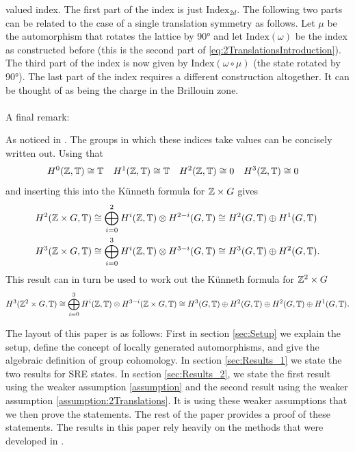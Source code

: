 \documentclass[11pt,a4paper,twoside]{article}
\numberwithin{equation}{section}
\begin{document}
	valued index. The first part of the index is just $\textrm{Index}_{2d}$. The following two parts can be related to the case of a single translation symmetry as follows. Let $\mu$ be the automorphism that rotates the lattice by 90° and let $\textrm{Index}(\omega)$ be the index as constructed before (this is the second part of \ref{eq:2TranslationsIntroduction}). The third part of the index is now given by $\textrm{Index}(\omega\circ\mu)$ (the state rotated by 90°). The last part of the index requires a different construction altogether. It can be thought of as being the charge in the Brillouin zone.
	\\\\
	A final remark:
	\begin{remark}
		As noticed in \cite{Chen_2013}. The groups in which these indices take values can be concisely written out. Using that
		\begin{align}
			H^0(\mathbb Z,\mathbb T)&\cong \mathbb T& H^1(\mathbb Z,\mathbb T)&\cong \mathbb T& H^2(\mathbb Z,\mathbb T)&\cong 0&H^3(\mathbb Z,\mathbb T)&\cong 0
		\end{align}
		and inserting this into the K\"unneth formula for $\mathbb Z\times G$ gives
		\begin{align}
			H^2(\mathbb Z \times G,\mathbb T)&\cong \bigoplus_{i=0}^2 H^i(\mathbb Z,\mathbb T)\otimes H^{2-i}(G,\mathbb T)\cong H^2(G,\mathbb T)\oplus H^1(G,\mathbb T)\\
			H^3(\mathbb Z \times G,\mathbb T)&\cong \bigoplus_{i=0}^3 H^i(\mathbb Z,\mathbb T)\otimes H^{3-i}(G,\mathbb T)\cong H^3(G,\mathbb T)\oplus H^2(G,\mathbb T).
		\end{align}
		This result can in turn be used to work out the K\"unneth formula for $\mathbb Z^2\times G$
		\begin{equation}
			H^3(\mathbb Z^2\times G,\mathbb T)\cong \bigoplus_{i=0}^3 H^i(\mathbb Z,\mathbb T)\otimes H^{3-i}(\mathbb Z\times G,\mathbb T)\cong H^3(G,\mathbb T)\oplus H^2(G,\mathbb T)\oplus H^2(G,\mathbb T)\oplus H^1(G,\mathbb T).
		\end{equation}
	\end{remark}
	The layout of this paper is as follows: First in section \ref{sec:Setup} we explain the setup, define the concept of locally generated automorphisms, and give the algebraic definition of group cohomology. In section \ref{sec:Results_1} we state the two results for SRE states. In section \ref{sec:Results_2}, we state the first result using the weaker assumption \ref{assumption} and the second result using the weaker assumption \ref{assumption:2Translations}. It is using these weaker assumptions that we then prove the statements. The rest of the paper provides a proof of these statements. The results in this paper rely heavily on the methods that were developed in \cite{ogata2021h3gmathbb}.
\end{document}
